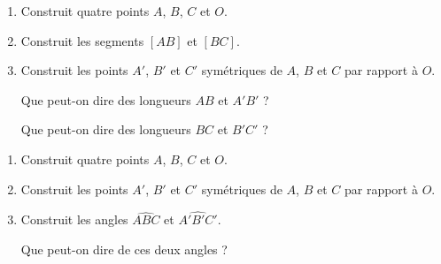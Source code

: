 \documentclass[a4paper,12pt]{article}
\begin{document}
\begin{exercice}
	\begin{enumerate}
		\item Construit quatre points $A$, $B$, $C$ et $O$.
		\item Construit les segments $[AB]$ et $[BC]$.
		\item Construit les points $A'$, $B'$ et $C'$ symétriques de $A$, $B$ et $C$ par rapport à $O$.

		      Que peut-on dire des longueurs $AB$ et $A'B'$ ? \vspace{2em}

		      Que peut-on dire des longueurs $BC$ et $B'C'$ ? \vspace{2em}
	\end{enumerate}
\end{exercice}

\begin{exercice}
	\begin{enumerate}
		\item Construit quatre points $A$, $B$, $C$ et $O$.
		\item Construit les points $A'$, $B'$ et $C'$ symétriques de $A$, $B$ et $C$ par rapport à $O$.
		\item Construit les angles $\widehat{ABC}$ et $\widehat{A'B'C'}$.

		      Que peut-on dire de ces deux angles ?
	\end{enumerate}
\end{exercice}
\end{document}
